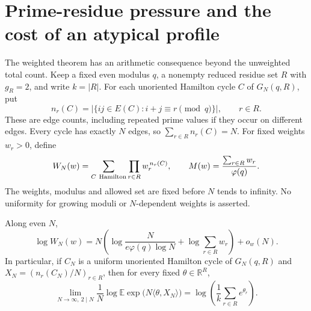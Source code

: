 \section{Prime-residue pressure and the cost of an atypical profile}
\label{sec:residuepressure}
The weighted theorem has an arithmetic consequence beyond the
unweighted total count.
Keep a fixed even modulus \(q\), a nonempty reduced residue set
\(R\) with \(g_R=2\), and write \(k=|R|\).
For each unoriented Hamilton cycle \(C\) of \(G_N(q,R)\), put
\[
 n_r(C)=|\{ij\in E(C):i+j\equiv r\pmod q\}|,\qquad r\in R.
\]
These are edge counts, including repeated prime values if they
occur on different edges. Every cycle has exactly \(N\) edges,
so \(\sum_{r\in R}n_r(C)=N\).
For fixed weights \(w_r>0\), define
\[
 W_N(w)=\sum_{C\ {\rm Hamilton}}\prod_{r\in R}w_r^{\,n_r(C)},
 \qquad
 M(w)=\frac{\sum_{r\in R}w_r}{\varphi(q)}.
\]
The weights, modulus and allowed set are fixed before \(N\)
tends to infinity. No uniformity for growing moduli or
\(N\)-dependent weights is asserted.

\begin{theorem}
\label{thm:residuepressure}
Along even \(N\),
\[
 \log W_N(w)
 =N\left(\log\frac{N}{e\varphi(q)\log N}
                      +\log\sum_{r\in R}w_r\right)+o_w(N).
\]
In particular, if \(C_N\) is a uniform unoriented Hamilton cycle
of \(G_N(q,R)\) and \(X_N=(n_r(C_N)/N)_{r\in R}\), then for every
fixed \(\theta\in\mathbb R^R\),
\[
 \lim_{N\to\infty,\ 2\mid N}\frac1N
      \log\mathbb E\exp\bigl(N\langle\theta,X_N\rangle\bigr)
       =\log\left(\frac1k\sum_{r\in R}e^{\theta_r}\right).
\]
\end{theorem}

